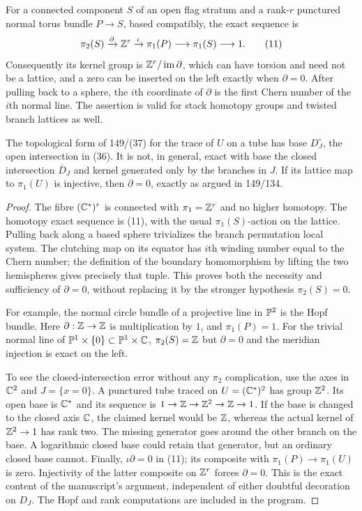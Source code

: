 \begin{theorem}\label{P1b3}
For a connected component $S$ of an open flag stratum and a rank-$r$
punctured normal torus bundle $P\to S$, based compatibly, the exact
sequence is
\[
 \pi_2(S)\xrightarrow{\partial}\mathbb Z^r\xrightarrow{\iota}
 \pi_1(P)\longrightarrow\pi_1(S)\longrightarrow1.           \tag{11}
\]
Consequently its kernel group is $\mathbb Z^r/\operatorname{im}\partial$,
which can have torsion and need not be a lattice,
and a zero can be inserted on the left exactly when $\partial=0$.
After pulling back to a sphere, the $i$th coordinate of $\partial$ is
the first Chern number of the $i$th normal line.  The assertion is valid
for stack homotopy groups and twisted branch lattices as well.

The topological form of 149/(37) for the trace of $U$ on a tube has
base $D_J^\circ$, the open intersection in (36).  It is not, in general,
exact with base the closed intersection $\overline D_J$ and kernel
generated only by the branches in $J$.  If its lattice map to
$\pi_1(U)$ is injective, then $\partial=0$, exactly as argued in
149/134.
\end{theorem}
\begin{proof}
The fibre $(\mathbb C^*)^r$ is connected with $\pi_1=\mathbb Z^r$ and no higher
homotopy.  The homotopy exact sequence is (11), with the usual
$\pi_1(S)$-action on the lattice.  Pulling back along a based sphere
trivializes the branch permutation local system.  The clutching map
on its equator has $i$th winding number equal to the Chern number;
the definition of the boundary homomorphism by lifting the two
hemispheres gives precisely that tuple.  This proves both the
necessity and sufficiency of $\partial=0$, without replacing it by
the stronger hypothesis $\pi_2(S)=0$.

For example, the normal circle bundle of a projective line in
$\mathbb P^2$ is the Hopf bundle.  Here $\partial:\mathbb Z\to\mathbb Z$ is multiplication
by $1$, and $\pi_1(P)=1$.  For the trivial normal line of
$\mathbb P^1\times\{0\}\subset\mathbb P^1\times\mathbb C$, $\pi_2(S)=\mathbb Z$ but
$\partial=0$ and the meridian injection is exact on the left.

To see the closed-intersection error without any $\pi_2$ complication,
use the axes in $\mathbb C^2$ and $J=\{x=0\}$.  A punctured tube traced on
$U=(\mathbb C^*)^2$ has group $\mathbb Z^2$.  Its open base is $\mathbb C^*$ and its
sequence is $1\to\mathbb Z\to\mathbb Z^2\to\mathbb Z\to1$.  If the base is changed to
the closed axis $\mathbb C$, the claimed kernel would be $\mathbb Z$, whereas the
actual kernel of $\mathbb Z^2\to1$ has rank two.  The missing generator
goes around the other branch on the base.  A logarithmic closed base
could retain that generator, but an ordinary closed base cannot.
Finally, $\iota\partial=0$ in (11); its composite with
$\pi_1(P)\to\pi_1(U)$ is zero.  Injectivity of the latter composite
on $\mathbb Z^r$ forces $\partial=0$.  This is the exact content of the
manuscript's argument, independent of either doubtful decoration on
$D_J$.  The Hopf and rank computations are included in the program.
\end{proof}
